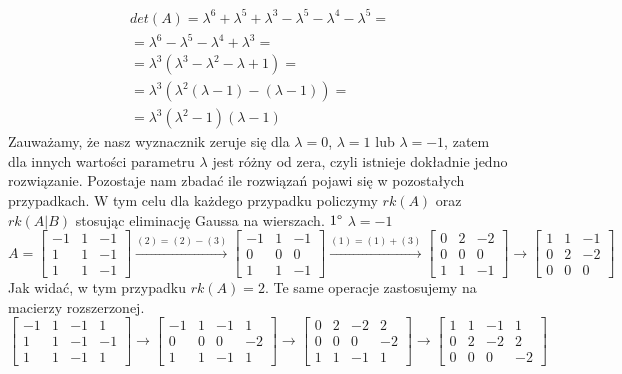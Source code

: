 \documentclass[12pt,a4paper]{article}
\begin{document}
\[
\begin{array}{c}
det(A)=\lambda^6 + \lambda^5 + \lambda^3 - \lambda^5 - \lambda^4-\lambda^5 =\\
=\lambda^6 - \lambda^5 -\lambda^4 +\lambda^3=\\
=\lambda^3( \lambda^3 - \lambda^2 - \lambda + 1)=\\
=\lambda^3(\lambda^2(\lambda - 1) - (\lambda - 1))=\\
=\lambda^3(\lambda^2-1)(\lambda-1)
\end{array}
\]
Zauważamy, że nasz wyznacznik zeruje się dla \(\lambda = 0\), \(\lambda = 1\) lub \(\lambda=-1\), zatem dla innych wartości parametru \(\lambda\) jest różny od zera, czyli istnieje dokładnie jedno rozwiązanie. Pozostaje nam zbadać ile rozwiązań pojawi się w pozostałych przypadkach. W tym celu dla każdego przypadku policzymy \(rk(A)\) oraz \(rk(A|B)\) stosując eliminację Gaussa na wierszach.
\vskip 0.4cm
\noindent
\textbf{\(1\degree\)} \(\lambda=-1\)
\[
A=
\left[
\begin{array}{ccc}
-1 & 1 & -1\\
1 & 1 & -1 \\
1 & 1 & -1
\end{array}\right]
\xrightarrow{(2)=(2)-(3)}
\left[
\begin{array}{ccc}
-1 & 1 & -1\\
0 & 0 & 0 \\
1 & 1 & -1
\end{array}\right]
\xrightarrow{(1)=(1)+(3)}
\left[
\begin{array}{ccc}
0 & 2 & -2\\
0 & 0 & 0 \\
1 & 1 & -1
\end{array}\right]
\xrightarrow{}
\left[
\begin{array}{ccc}
1 & 1 & -1\\
0 & 2 & -2\\
0 & 0 & 0 
\end{array}\right]
\]
Jak widać, w tym przypadku \(rk(A)=2\). Te same operacje zastosujemy na macierzy rozszerzonej.
\[
\left[
\begin{array}{cccc}
-1 & 1 & -1 & 1\\
1 & 1 & -1 & -1\\
1 & 1 & -1 & 1
\end{array}\right]
\xrightarrow{}
\left[
\begin{array}{cccc}
-1 & 1 & -1 &1\\
0 & 0 & 0 &-2\\
1 & 1 & -1 & 1
\end{array}\right]
\xrightarrow{}
\left[
\begin{array}{cccc}
0 & 2 & -2 & 2\\
0 & 0 & 0 & -2\\
1 & 1 & -1 & 1
\end{array}\right]
\xrightarrow{}
\left[
\begin{array}{cccc}
1 & 1 & -1 & 1\\
0 & 2 & -2 & 2\\
0 & 0 & 0 &-2 
\end{array}\right]
\]
\end{document}

